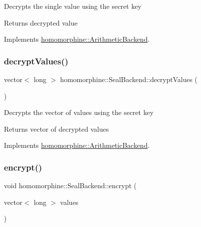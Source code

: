 Decrypts the single value using the secret key

\begin{DoxyReturn}{Returns}
decrypted value 
\end{DoxyReturn}


Implements \mbox{\hyperlink{classhomomorphine_1_1_arithmetic_backend_af4aad032c46ce51e608092ac206882bd}{homomorphine\+::\+Arithmetic\+Backend}}.

\mbox{\label{classhomomorphine_1_1_seal_backend_afa5f6cbb10d74c1911fcb88f722a0159}} 
\subsubsection{\texorpdfstring{decryptValues()}{decryptValues()}}
{\footnotesize\ttfamily vector$<$ long $>$ homomorphine\+::\+Seal\+Backend\+::decrypt\+Values (\begin{DoxyParamCaption}{ }\end{DoxyParamCaption})\hspace{0.3cm}{\ttfamily [virtual]}}

Decrypts the vector of values using the secret key

\begin{DoxyReturn}{Returns}
vector of decrypted values 
\end{DoxyReturn}


Implements \mbox{\hyperlink{classhomomorphine_1_1_arithmetic_backend_a2fb1ce64e74c4930b7d364ce3b9cc8fe}{homomorphine\+::\+Arithmetic\+Backend}}.

\mbox{\label{classhomomorphine_1_1_seal_backend_a89ea7aba58ef337476035848c903f08c}} 
\subsubsection{\texorpdfstring{encrypt()}{encrypt()}\hspace{0.1cm}{\footnotesize\ttfamily [1/2]}}
{\footnotesize\ttfamily void homomorphine\+::\+Seal\+Backend\+::encrypt (\begin{DoxyParamCaption}\item[{vector$<$ long $>$}]{values }\end{DoxyParamCaption})\hspace{0.3cm}{\ttfamily [virtual]}}

